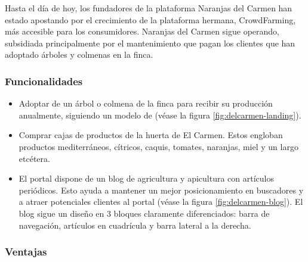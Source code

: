 Hasta el día de hoy, los fundadores de la plataforma Naranjas del Carmen han estado apostando por el crecimiento de la plataforma hermana, CrowdFarming, más accesible para los consumidores. Naranjas del Carmen sigue operando, subsidiada principalmente por el mantenimiento que pagan los clientes que han adoptado árboles y colmenas en la finca.

\subsubsection{Funcionalidades}

\begin{itemize}

	\item Adoptar de un árbol o colmena de la finca para recibir su producción anualmente, siguiendo un modelo de  (véase la figura \ref{fig:delcarmen-landing}).

	\item Comprar cajas de productos de la huerta de El Carmen. Estos engloban productos mediterráneos, cítricos, caquis, tomates, naranjas, miel y un largo etcétera.

	\item El portal dispone de un blog de agricultura y apicultura con artículos periódicos. Esto ayuda a mantener un mejor posicionamiento en buscadores y a atraer potenciales clientes al portal (véase la figura \ref{fig:delcarmen-blog}). El blog sigue un diseño en 3 bloques claramente diferenciados: barra de navegación, artículos en cuadrícula y barra lateral a la derecha.

\end{itemize}


\subsubsection{Ventajas}


